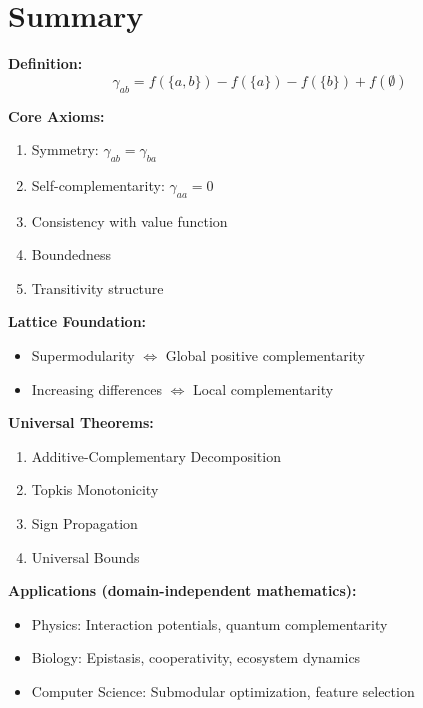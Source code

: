 \section{Summary}
\label{sec:summary}

\begin{tcolorbox}[colback=gray!5!white,colframe=gray!75!black,title=\textbf{Summary: Mathematical Foundations of Complementarity}]

\textbf{Definition:}
\begin{equation}
\gamma_{ab} = f(\{a, b\}) - f(\{a\}) - f(\{b\}) + f(\emptyset)
\end{equation}

\textbf{Core Axioms:}
\begin{enumerate}[noitemsep]
    \item Symmetry: $\gamma_{ab} = \gamma_{ba}$
    \item Self-complementarity: $\gamma_{aa} = 0$
    \item Consistency with value function
    \item Boundedness
    \item Transitivity structure
\end{enumerate}

\textbf{Lattice Foundation:}
\begin{itemize}[noitemsep]
    \item Supermodularity $\Leftrightarrow$ Global positive complementarity
    \item Increasing differences $\Leftrightarrow$ Local complementarity
\end{itemize}

\textbf{Universal Theorems:}
\begin{enumerate}[noitemsep]
    \item Additive-Complementary Decomposition
    \item Topkis Monotonicity
    \item Sign Propagation
    \item Universal Bounds
\end{enumerate}

\textbf{Applications (domain-independent mathematics):}
\begin{itemize}[noitemsep]
    \item Physics: Interaction potentials, quantum complementarity
    \item Biology: Epistasis, cooperativity, ecosystem dynamics
    \item Computer Science: Submodular optimization, feature selection
\end{itemize}

\end{tcolorbox}

